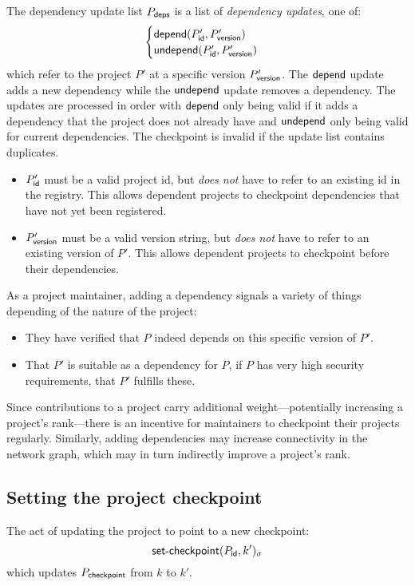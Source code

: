 The dependency update list $P_{\mathsf{deps}}$ is a list of \emph{dependency
  updates}, one of:
\[
    \begin{cases}
        \mathsf{depend}(P'_{\mathsf{id}}, P'_{\mathsf{version}}) \\
        \mathsf{undepend}(P'_{\mathsf{id}}, P'_{\mathsf{version}})
    \end{cases}
\]
which refer to the project $P'$ at a specific version $P'_{\mathsf{version}}$.
The $\mathsf{depend}$ update adds a new dependency while the $\mathsf{undepend}$ update removes
a dependency. The updates are processed in order with $\mathsf{depend}$ only being
valid if it adds a dependency that the project does not already have and
$\mathsf{undepend}$ only being valid for current dependencies. The checkpoint is
invalid if the update list contains duplicates.


\bigskip
\validation
\begin{itemize}
    \item $P'_{\mathsf{id}}$ must be a valid project id, but \emph{does not}
        have to refer to an existing id in the registry. This allows dependent
        projects to checkpoint dependencies that have not yet been registered.
    \item $P'_{\mathsf{version}}$ must be a valid version string, but \emph{does not}
        have to refer to an existing version of $P'$. This allows dependent projects
        to checkpoint before their dependencies.
\end{itemize}
As a project maintainer, adding a dependency signals a variety of things
depending of the nature of the project:
\begin{itemize}
\item They have verified that $P$ indeed depends on this specific
  version of $P'$.
\item That $P'$ is suitable as a dependency for $P$, \eg{} if $P$ has
  very high security requirements, that $P'$ fulfills these.
\end{itemize}
\noindent Since contributions to a project carry additional
weight---potentially increasing a project's rank---there is an incentive
for maintainers to checkpoint their projects regularly.  Similarly, adding
dependencies may increase connectivity in the network graph, which may in turn
indirectly improve a project's rank.

\subsection{Setting the project checkpoint}
The act of updating the project to point to a new checkpoint:
\[
    \operatorname{\mathsf{set-checkpoint}}\lparen P_{\mathsf{id}}, k'\rparen_\sigma
\]
which updates $P_{\mathsf{checkpoint}}$ from $k$ to $k'$.

